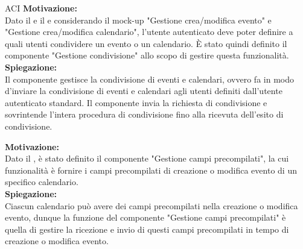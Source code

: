 \begin{listaPersonale}{ACI}
    \textbf{Motivazione:}\\
    Dato il  e il  e considerando il mock-up  "Gestione crea/modifica evento" e  "Gestione crea/modifica calendario", l'utente autenticato deve poter definire a quali utenti condividere un evento o un calendario. È stato quindi definito il componente "Gestione condivisione" allo scopo di gestire questa funzionalità. \\
    \textbf{Spiegazione:} \\Il componente gestisce la condivisione di eventi e calendari, ovvero fa in modo d'inviare la condivisione di eventi e calendari agli utenti definiti dall'utente autenticato standard. Il componente invia la richiesta di condivisione e sovrintende l'intera procedura di condivisione fino alla ricevuta dell'esito di condivisione.


    \textbf{Motivazione:}\\
    Dato il , è stato definito il componente "Gestione campi precompilati", la cui funzionalità è fornire i campi precompilati di creazione o modifica evento di un specifico calendario.\\
    \textbf{Spiegazione:} \\Ciascun calendario può avere dei campi precompilati nella creazione o modifica evento, dunque la funzione del componente "Gestione campi precompilati" è quella di gestire la ricezione e invio di questi campi precompilati in tempo di creazione o modifica evento.



\end{listaPersonale}
